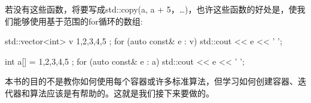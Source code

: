 若没有这些函数，将要写成std::copy(a, a + 5，…)，也许这些函数的好处是，使我们能够使用基于范围的for循环的数组:

\begin{cpp}
std::vector<int> v{ 1,2,3,4,5 };
for (auto const& e : v)
	std::cout << e << ' ';

int a[] = { 1,2,3,4,5 };
for (auto const& e : a)
	std::cout << e << ' ';
\end{cpp}

本书的目的不是教你如何使用每个容器或许多标准算法，但学习如何创建容器、迭代器和算法应该是有帮助的。这就是我们接下来要做的。





















